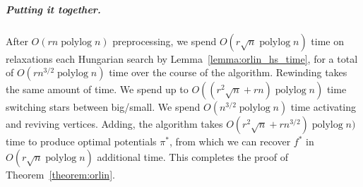 \documentclass[a4paper,UKenglish]{socg-lipics-v2018}
\def\etal{\emph{et~al.}}
\def\etal{\textit{et~al.}}
\def\polylog{\mathop{\mathrm{polylog}}}
\theoremstyle{plain}
\numberwithin{figure}{section}
\renewcommand{\paragraph}{\subparagraph}
\begin{document}
\paragraph{Putting it together.}
After $O(rn\polylog n)$ preprocessing, we spend $O(r\sqrt{n}\polylog n)$ time
on relaxations each Hungarian search by Lemma~\ref{lemma:orlin_hs_time},
for a total of $O(rn^{3/2}\polylog n)$ time over the course of the algorithm.
Rewinding takes the same amount of time.
We spend up to $O((r^2\sqrt{n} + rn)\polylog n)$ time switching stars between big/small.
We spend $O(n^{3/2}\polylog n)$ time activating and reviving vertices.
Adding, the algorithm takes $O(r^2\sqrt{n} + rn^{3/2})\polylog n)$ time to
produce optimal potentials $\pi^*$, from which we can recover $f^*$ in
$O(r\sqrt{n}\polylog n)$ %
additional time.
This completes the proof of Theorem~\ref{theorem:orlin}.






\newpage
\appendix
\end{document}
